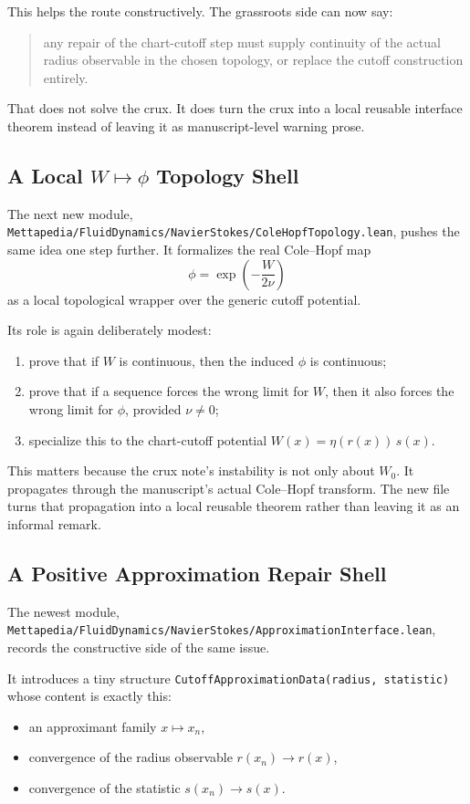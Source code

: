 \documentclass[11pt]{article}
\theoremstyle{remark}
\begin{document}
This helps the route constructively.  The grassroots side can now say:
\begin{quote}
any repair of the chart-cutoff step must supply continuity of the actual radius
observable in the chosen topology, or replace the cutoff construction entirely.
\end{quote}

That does not solve the crux.  It does turn the crux into a local reusable
interface theorem instead of leaving it as manuscript-level warning prose.

\subsection[A Local W-to-phi Topology Shell]{A Local \(W \mapsto \phi\) Topology Shell}

The next new module,
\texttt{Mettapedia/FluidDynamics/NavierStokes/ColeHopfTopology.lean},
pushes the same idea one step further.  It formalizes the real Cole--Hopf map
\[
  \phi = \exp\!\left(-\frac{W}{2\nu}\right)
\]
as a local topological wrapper over the generic cutoff potential.

Its role is again deliberately modest:
\begin{enumerate}[leftmargin=1.5em]
  \item prove that if \(W\) is continuous, then the induced \(\phi\) is
  continuous;
  \item prove that if a sequence forces the wrong limit for \(W\), then it also
  forces the wrong limit for \(\phi\), provided \(\nu \neq 0\);
  \item specialize this to the chart-cutoff potential
  \(W(x)=\eta(r(x))\,s(x)\).
\end{enumerate}

This matters because the crux note's instability is not only about \(W_0\).  It
propagates through the manuscript's actual Cole--Hopf transform.  The new file
turns that propagation into a local reusable theorem rather than leaving it as
an informal remark.

\subsection{A Positive Approximation Repair Shell}

The newest module,
\texttt{Mettapedia/FluidDynamics/NavierStokes/ApproximationInterface.lean},
records the constructive side of the same issue.

It introduces a tiny structure
\texttt{CutoffApproximationData(radius, statistic)}
whose content is exactly this:
\begin{itemize}[leftmargin=1.5em]
  \item an approximant family \(x \mapsto x_n\),
  \item convergence of the radius observable \(r(x_n) \to r(x)\),
  \item convergence of the statistic \(s(x_n) \to s(x)\).
\end{itemize}
\end{document}
